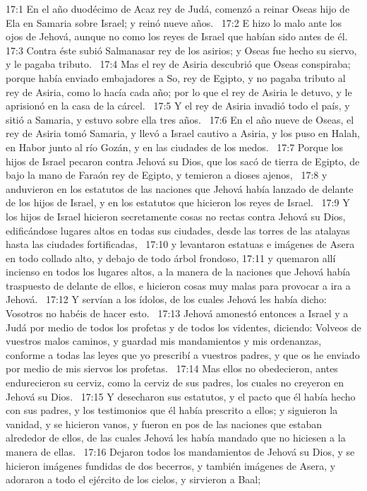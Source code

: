17:1 En el año duodécimo de Acaz rey de Judá, comenzó a reinar Oseas hijo de Ela en Samaria sobre Israel; y reinó nueve años.  
17:2 E hizo lo malo ante los ojos de Jehová, aunque no como los reyes de Israel que habían sido antes de él.  
17:3 Contra éste subió Salmanasar rey de los asirios; y Oseas fue hecho su siervo, y le pagaba tributo.  
17:4 Mas el rey de Asiria descubrió que Oseas conspiraba; porque había enviado embajadores a So, rey de Egipto, y no pagaba tributo al rey de Asiria, como lo hacía cada año; por lo que el rey de Asiria le detuvo, y le aprisionó en la casa de la cárcel.  
17:5 Y el rey de Asiria invadió todo el país, y sitió a Samaria, y estuvo sobre ella tres años.  
17:6 En el año nueve de Oseas, el rey de Asiria tomó Samaria, y llevó a Israel cautivo a Asiria, y los puso en Halah, en Habor junto al río Gozán, y en las ciudades de los medos.  
17:7 Porque los hijos de Israel pecaron contra Jehová su Dios, que los sacó de tierra de Egipto, de bajo la mano de Faraón rey de Egipto, y temieron a dioses ajenos,  
17:8 y anduvieron en los estatutos de las naciones que Jehová había lanzado de delante de los hijos de Israel, y en los estatutos que hicieron los reyes de Israel.  
17:9 Y los hijos de Israel hicieron secretamente cosas no rectas contra Jehová su Dios, edificándose lugares altos en todas sus ciudades, desde las torres de las atalayas hasta las ciudades fortificadas,  
17:10 y levantaron estatuas e imágenes de Asera en todo collado alto, y debajo de todo árbol frondoso, 
17:11 y quemaron allí incienso en todos los lugares altos, a la manera de la naciones que Jehová había traspuesto de delante de ellos, e hicieron cosas muy malas para provocar a ira a Jehová.  
17:12 Y servían a los ídolos, de los cuales Jehová les había dicho: Vosotros no habéis de hacer esto.  
17:13 Jehová amonestó entonces a Israel y a Judá por medio de todos los profetas y de todos los videntes, diciendo: Volveos de vuestros malos caminos, y guardad mis mandamientos y mis ordenanzas, conforme a todas las leyes que yo prescribí a vuestros padres, y que os he enviado por medio de mis siervos los profetas.  
17:14 Mas ellos no obedecieron, antes endurecieron su cerviz, como la cerviz de sus padres, los cuales no creyeron en Jehová su Dios.  
17:15 Y desecharon sus estatutos, y el pacto que él había hecho con sus padres, y los testimonios que él había prescrito a ellos; y siguieron la vanidad, y se hicieron vanos, y fueron en pos de las naciones que estaban alrededor de ellos, de las cuales Jehová les había mandado que no hiciesen a la manera de ellas.  
17:16 Dejaron todos los mandamientos de Jehová su Dios, y se hicieron imágenes fundidas de dos becerros, y también imágenes de Asera, y adoraron a todo el ejército de los cielos, y sirvieron a Baal;  
